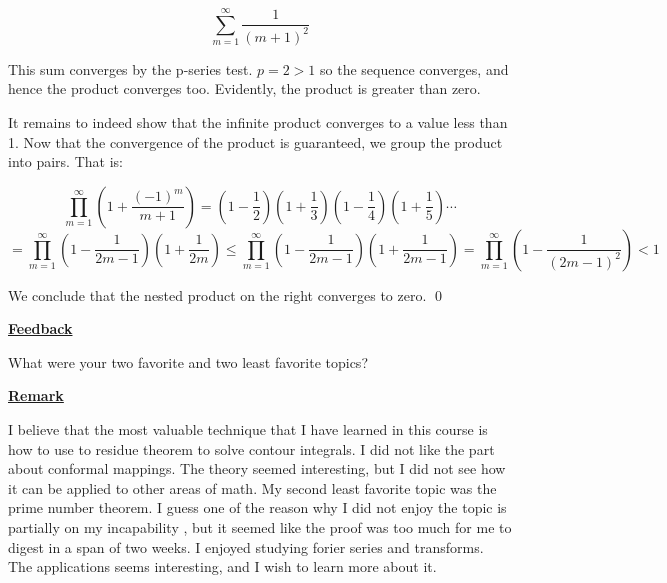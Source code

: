 \documentclass{article}
\newcommand{\new}[1]{
    \vspace{2mm}
    \noindent
    \textbf{
    \underline{#1}}
}
\begin{document}
\[
    \sum_{m = 1}^\infty \frac{1}{(m+1)^2}
\]

This sum converges by the p-series test. $p = 2 > 1$ so the 
sequence converges, and hence the product converges too. 
Evidently, the product is greater than zero. 

It remains to indeed show that the infinite product converges to 
a value less than 1. Now that the convergence of the product is 
guaranteed, we group the product into pairs. That is:


\newcommand{\term}[1]{{
    \left(
        1 + \frac{1}{#1}
    \right)
}
}

\newcommand{\nterm}[1]{{
    \left(
        1 - \frac{1}{#1}
    \right)
}
}
\[
    \prod^\infty_{m = 1}\left(1 + \frac{(-1)^m}{m + 1}\right)
    =
    \nterm{2} \term{3} \nterm{4} \term{5} \cdots
\]
\[
    = 
    \prod^\infty_{m = 1}\nterm{2m - 1}\term{2m}
    \leq 
    \prod^\infty_{m = 1}\nterm{2m - 1}\term{2m - 1}
    = 
    \prod^\infty_{m = 1}\nterm{(2m-1)^2} < 1
\]

We conclude that the nested product on the right converges to zero. 
\qed

\newpage
\new{Feedback}
What were your two favorite and two least 
favorite topics?

\new{Remark}
 I believe that 
the most valuable technique that I have learned 
in this course is how to use to residue 
theorem to solve contour integrals. I did not 
like the part about conformal mappings. The 
theory seemed interesting, but I did not see 
how it can be applied to other areas of math. 
My second least favorite topic was the prime number 
theorem. I guess one of the reason why I did not 
enjoy the topic is partially on my incapability 
, but it seemed 
like the proof was too much for me to digest 
in a span of two weeks. 
I enjoyed studying forier series and transforms. 
The applications seems interesting, and I wish 
to learn more about it. 
\end{document}
